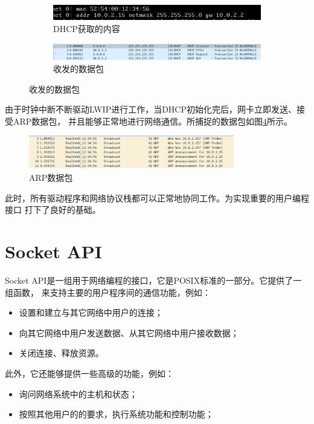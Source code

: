 \documentclass[a4paper,twoside]{ctexrep}
\begin{document}
\begin{spacing}{1.2}
\begin{figure}[htb]
	\centering
	\caption{DHCP初始化}
	\label{fig:http}
	\begin{subfigure}{0.4\textwidth}
		\centering
		\includegraphics[width=\textwidth]{initproto.png}
		\caption{DHCP获取的内容}
		\label{fig:netadd}
	\end{subfigure}
	\begin{subfigure}{0.4\textwidth}
		\centering
		\includegraphics[width=\textwidth]{dhcppack.png}
		\caption{收发的数据包}
		\label{fig:dhcppacks}
	\end{subfigure}
\end{figure}

由于时钟中断不断驱动LWIP进行工作，当DHCP初始化完后，网卡立即发送、接受ARP数据包，
并且能够正常地进行网络通信。所捕捉的数据包如图\ref{fig:arppack}所示。
\begin{figure}[htb]
	\centering
	\caption{ARP数据包}
	\label{fig:arppack}
	\includegraphics[width=0.8\textwidth]{arppack.png}
\end{figure}
此时，所有驱动程序和网络协议栈都可以正常地协同工作。为实现重要的用户编程接口
打下了良好的基础。

\section{Socket API}

Socket API是一组用于网络编程的接口，它是POSIX标准的一部分。它提供了一组函数，
来支持主要的用户程序间的通信功能，例如：
\begin{itemize}
	\item 设置和建立与其它网络中用户的连接；
	\item 向其它网络中用户发送数据、从其它网络中用户接收数据；
	\item 关闭连接、释放资源。
\end{itemize}
此外，它还能够提供一些高级的功能，例如：
\begin{itemize}
	\item 询问网络系统中的主机和状态；
	\item 按照其他用户的的要求，执行系统功能和控制功能；
\end{itemize}


\end{spacing}
\end{document}
